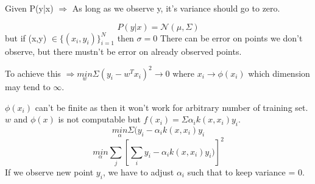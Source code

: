 \documentclass[12pt]{article}
\begin{document}
\noindent Given P(y|x) $\Rightarrow$ As long as we observe y, it's variance should go to zero.

\[P(y|x) = \mathcal{N}(\mu, \Sigma)\]
but if (x,y) $\in \{(x_i, y_i)\}_{i=1}^N$ then $\sigma = 0$
There can be error on points we don't observe, but there mustn't be error on already observed points.

\noindent To achieve this $\Rightarrow \underset{w}{min} \Sigma (y_i - w^Tx_i)^2 \rightarrow 0 $ where $x_i \rightarrow \phi(x_i)$ which dimension may tend to $\infty $.

$\phi(x_i)$ can't be finite as then it won't work for arbitrary number of training set. $w$ and $\phi(x)$ is not computable but $f(x_i) = \Sigma \alpha_i k (x,x_i) y_i$.
\[\underset{\alpha}{min} \Sigma (y_i - \alpha_i k (x, x_i) y_i\]
\[\underset{\alpha}{min} \sum_{j} \left[\sum_{i} y_i - \alpha_i k (x, x_i) y_i ) \right]^2 \]
If we observe new point $y_i$, we have to adjust $\alpha_i$ such that to keep variance = 0.

\end{document}
